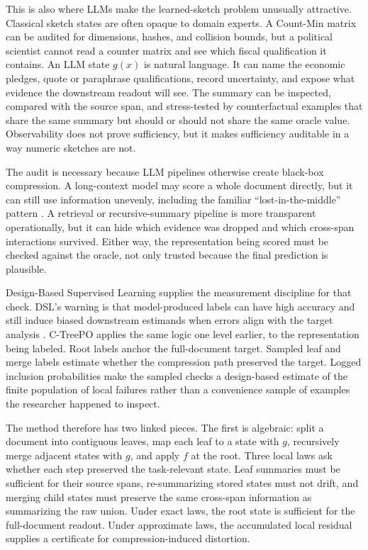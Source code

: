 This is also where LLMs make the learned-sketch problem unusually attractive.
Classical sketch states are often opaque to domain experts. A Count-Min matrix
can be audited for dimensions, hashes, and collision bounds, but a political
scientist cannot read a counter matrix and see which fiscal qualification it
contains. An LLM state $g(x)$ is natural language. It can name the economic
pledges, quote or paraphrase qualifications, record uncertainty, and expose
what evidence the downstream readout will see. The summary can be inspected,
compared with the source span, and stress-tested by counterfactual examples
that share the same summary but should or should not share the same oracle
value. Observability does not prove sufficiency, but it makes sufficiency
auditable in a way numeric sketches are not.

The audit is necessary because LLM pipelines otherwise create black-box
compression. A long-context model may score a whole document directly, but it
can still use information unevenly, including the familiar
``lost-in-the-middle'' pattern \citep{LiuEtAl2024LostMiddle}. A retrieval or
recursive-summary pipeline is more transparent operationally, but it can hide
which evidence was dropped and which cross-span interactions survived. Either
way, the representation being scored must be checked against the oracle, not
only trusted because the final prediction is plausible.

Design-Based Supervised Learning supplies the measurement discipline for that
check. DSL's warning is that model-produced labels can have high accuracy and
still induce biased downstream estimands when errors align with the target
analysis \citep{EgamiEtAl2024}. C-TreePO applies the same logic one level
earlier, to the representation being labeled. Root labels anchor the
full-document target. Sampled leaf and merge labels estimate whether the
compression path preserved the target. Logged inclusion probabilities make the
sampled checks a design-based estimate of the finite population of local
failures rather than a convenience sample of examples the researcher happened
to inspect.

The method therefore has two linked pieces. The first is algebraic: split a
document into contiguous leaves, map each leaf to a state with $g$, recursively
merge adjacent states with $g$, and apply $f$ at the root. Three local laws
ask whether each step preserved the task-relevant state. Leaf summaries must
be sufficient for their source spans, re-summarizing stored states must not
drift, and merging child states must preserve the same cross-span information
as summarizing the raw union. Under exact laws, the root state is sufficient
for the full-document readout. Under approximate laws, the accumulated local
residual supplies a certificate for compression-induced distortion.

